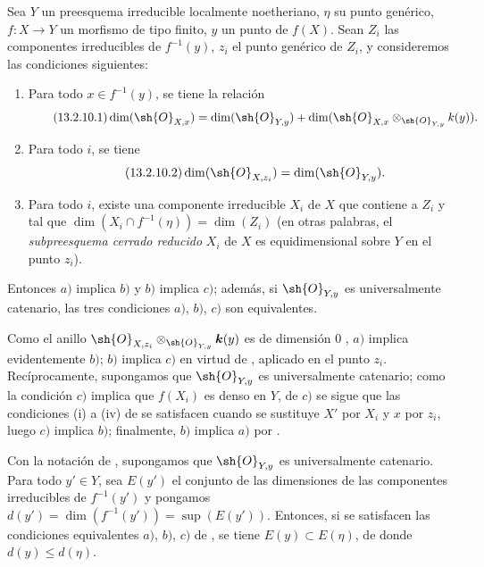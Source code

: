 \begin{proposition}[13.2.10]
\label{IV.13.2.10}
Sea $Y$ un preesquema irreducible localmente noetheriano, $\eta$ su punto genérico, $f:X\to Y$ un morfismo de tipo finito, $y$ un punto de $f(X)$.
Sean $Z_i$ las
componentes irreducibles de $f^{-1}(y)$, $z_i$ el punto genérico de $Z_i$, y consideremos las condiciones siguientes:
\begin{enumerate}[label=\emph{\alph*)}]
  \item Para todo $x\in f^{-1}(y)$, se tiene la relación
  \[
  \tag{13.2.10.1}
\label{IV.13.2.10.1}
    \dim(\sh{O}_{X,x})=\dim(\sh{O}_{Y,y})+\dim(\sh{O}_{X,x}\otimes_{\sh{O}_{Y,y}}k(y)).
  \]
  \item Para todo $i$, se tiene
  \[
  \label{IV.13.2.10.2}
\tag{13.2.10.2}
    \dim(\sh{O}_{X,z_i})=\dim(\sh{O}_{Y,y}).
  \]
  \item Para todo $i$, existe una componente irreducible $X_i$ de $X$ que contiene a $Z_i$ y tal que $\dim(X_i\cap f^{-1}(\eta))=\dim(Z_i)$ (en otras palabras, el \emph{subpreesquema cerrado reducido} $X_i$ de $X$ es equidimensional sobre $Y$ en el punto $z_i$).
\end{enumerate}
Entonces $a)$ implica $b)$ y $b)$ implica $c)$; además, si $\sh{O}_{Y,y}$ es universalmente catenario, las tres condiciones $a)$, $b)$, $c)$ son equivalentes.
\end{proposition}

Como el anillo $\sh{O}_{X,z_i}\otimes_{\sh{O}_{Y,y}}\boldsymbol k(y)$ es de dimensión $0$ , $a)$ implica evidentemente $b)$; $b)$ implica $c)$ en virtud de , aplicado en el punto $z_i$.
Recíprocamente, supongamos que $\sh{O}_{Y,y}$ es universalmente catenario; como la condición $c)$ implica que $f(X_i)$ es denso en $Y$, de $c)$ se sigue que las condiciones (i) a (iv) de  se satisfacen cuando se sustituye $X'$ por $X_i$ y $x$ por $z_i$, luego $c)$ implica $b)$; finalmente, $b)$ implica $a)$ por .

\begin{corollary}[13.2.11]
\label{IV.13.2.11}
Con la notación de , supongamos que $\sh{O}_{Y,y}$ es universalmente catenario.
Para todo $y'\in Y$, sea $E(y')$ el conjunto de las dimensiones de las componentes irreducibles de $f^{-1}(y')$ y pongamos $d(y')=\dim(f^{-1}(y'))=\sup(E(y'))$.
Entonces, si se satisfacen las condiciones equivalentes $a)$, $b)$, $c)$ de , se tiene $E(y)\subset E(\eta)$, de donde $d(y)\leq d(\eta)$.
\end{corollary}

